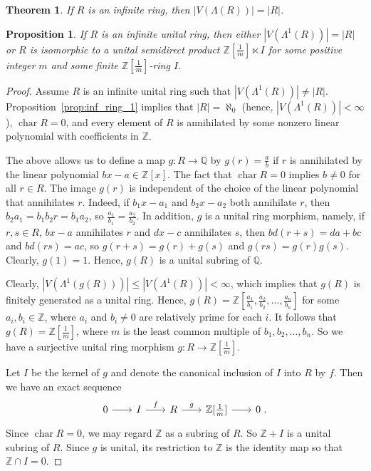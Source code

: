 \documentclass[10pt,a4paper]{amsart}
\newtheorem{proposition}{Proposition}
\newtheorem{theorem}{Theorem}
\newcommand{\Q}{\mathbb{Q}}
\newcommand{\Z}{\mathbb{Z}}
\DeclareMathOperator{\ch}{char}
\begin{document}
\begin{theorem}\label{thm:inf_ring}
    If $R$ is an infinite ring, then $|V(\Lambda(R))|=|R|$.
\end{theorem}

\begin{proposition}\label{thm:inf_ring_1}
    If $R$ is an infinite unital ring, then either $|V(\Lambda^1(R))|=|R|$ or $R$ is isomorphic to a unital semidirect product $\Z[\frac1m] \ltimes I$ for some positive integer $m$ and some finite $\Z[\frac1m]$-ring $I$.
\end{proposition}

\begin{proof}
Assume $R$ is an infinite unital ring such that $|V(\Lambda^1(R))| \neq |R|$.
Proposition~\ref{prop:inf_ring_1} implies that $|R|=\aleph_0$ (hence, $|V(\Lambda^1(R))|<\infty$), $\ch R = 0$, and every element of $R$ is annihilated by some nonzero linear polynomial with coefficients in $\Z$.

The above allows us to define a map $g \colon R \to \Q$ by $g(r)=\frac{a}{b}$ if $r$ is annihilated by the linear polynomial $bx-a \in \Z[x]$.
The fact that $\ch R = 0$ implies $b \neq 0$ for all $r \in R$.
The image $g(r)$ is independent of the choice of the linear polynomial that annihilates $r$. Indeed, if $b_1 x-a_1$ and $b_2x-a_2$ both annihilate $r$, then $b_2a_1=b_1b_2r=b_1a_2$, so $\frac{a_1}{b_1}=\frac{a_2}{b_2}$.
In addition, $g$ is a unital ring morphism, namely, if $r,s \in R$, $bx-a$ annihilates $r$ and $dx-c$ annihilates $s$, then $bd(r+s)=da+bc$ and $bd(rs)=ac$, so $g(r+s)=g(r)+g(s)$ and $g(rs)=g(r)g(s)$. Clearly, $g(1)=1$.
Hence, $g(R)$ is a unital subring of $\Q$.

Clearly, $|V(\Lambda^1(g(R)))| \leq |V(\Lambda^1(R))|<\infty$, which implies that $g(R)$ is finitely generated as a unital ring.
Hence, $g(R)=\Z[\frac{a_1}{b_1},\frac{a_2}{b_2},\ldots,\frac{a_n}{b_n}]$ for some $a_i,b_i \in \Z$, where $a_i$ and $b_i \neq 0$ are relatively prime for each $i$.
It follows that $g(R)=\Z[\frac1m]$, where $m$ is the least common multiple of $b_1,b_2,\ldots,b_n$.
So we have a surjective unital ring morphism $g \colon R \to \Z[\frac1m]$.

Let $I$ be the kernel of $g$ and denote the canonical inclusion of $I$ into $R$ by $f$. Then we have an exact sequence
\begin{equation}\label{eq:exact}
\begin{tikzcd}[sep=20pt]
0 & I & R & \Z[\frac1m] & 0 \ .
\arrow[from=1-1, to=1-2]
\arrow["f", from=1-2, to=1-3]
\arrow["g", from=1-3, to=1-4]
\arrow[from=1-4, to=1-5]
\end{tikzcd}
\end{equation}
Since $\ch R = 0$, we may regard $\Z$ as a subring of $R$.
So $\Z+I$ is a unital subring of $R$. Since $g$ is unital, its restriction to $\Z$ is the identity map so that $\Z \cap I=0$. 


\end{proof}
\end{document}
